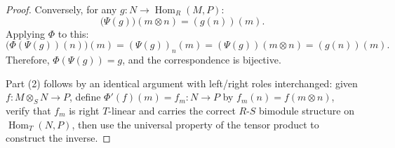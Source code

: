 \begin{proof}
    Conversely, for any $g : N \to \operatorname{Hom}_R(M, P)$:
    $$\bigl(\Psi(g)\bigr)(m \otimes n) = (g(n))(m).$$
    Applying $\Phi$ to this:
    $$\bigl(\Phi(\Psi(g))(n)\bigr)(m) = (\Psi(g))_n(m) = (\Psi(g))(m \otimes n) = (g(n))(m).$$
    Therefore, $\Phi(\Psi(g)) = g$, and the correspondence is bijective.

    Part (2) follows by an identical argument with left/right roles interchanged: given $f : M \otimes_S N \to P$, define $\Phi'(f)(m) = f_m : N \to P$ by $f_m(n) = f(m \otimes n)$, verify that $f_m$ is right $T$-linear and carries the correct $R$-$S$ bimodule structure on $\operatorname{Hom}_T(N, P)$, then use the universal property of the tensor product to construct the inverse.
\end{proof}
